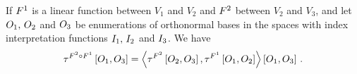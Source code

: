 \begin{theorem}
    \label{the:linearCompositionBasisEncoding}
    If $F^{1}$ is a linear function between $V_1$ and $V_2$  and $F^{2}$ between $V_2$ and $V_3$, and let $O_{1},\,O_{2}$ and $O_{3}$ be enumerations of orthonormal bases in the spaces with index interpretation functions $I_{1},\,I_{2}$ and $I_{3}$.
    We have
    \begin{align*}
        \tau^{F^{2}\circ F^{1}}\left[O_{1},O_{3}\right]
        = \left\langle 
            \tau^{F^{2}}\left[O_{2},O_{3}\right], \tau^{F^{1}}\left[O_{1},O_{2}\right]
        \right\rangle \left[ O_{1},O_{3} \right]  \, .
    \end{align*}
\end{theorem}

